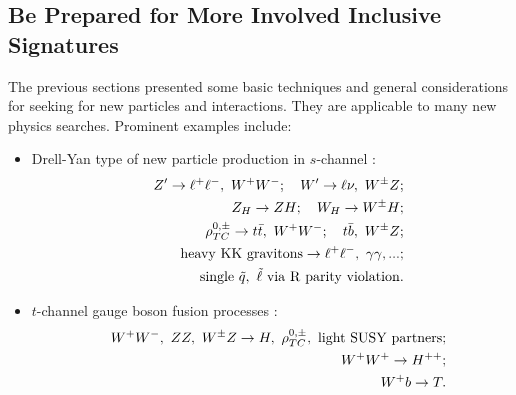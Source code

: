 \documentclass[12pt,prd,aps,floats,preprintnumbers,preprint,superscriptaddress,floatfix,nofootinbib]{revtex4}
\def\epem{e^+e^-}
\def\bea{\begin{eqnarray}}
\def\eea{\end{eqnarray}}
\begin{document}

\subsection{Be Prepared for More Involved Inclusive Signatures}
\label{more}

%
%
%
%

The previous sections presented some basic techniques and general
considerations for seeking for new particles and interactions. 
They are applicable to many new physics searches. 
 Prominent examples include:
\begin{itemize}
\item Drell-Yan type of new particle production in 
$s$-channel \cite{zprime,LH2,LH1,smoking,TC,RS,herbi2}:
\bea
\nonumber
&& Z' \to \ell^+\ell^-,\ W^+W^-;\quad W' \to \ell \nu,\ W^\pm Z; \\
\nonumber
&& Z_H \to ZH;\quad W_H \to W^\pm H;\\
\nonumber
&& \rho^{0,\pm}_{TC} \to t\bar t,\ W^+W^-;\quad t\bar b,\ W^\pm Z; \\
\nonumber
&& {\rm heavy\ KK\ gravitons}\to \ell^+\ell^-,\ \gamma\gamma, ... ;\\
&& {\rm single}\ \tilde q,\  \tilde\ell\ {\rm via\ R\ parity\ violation}.
\nonumber
\eea
\item $t$-channel gauge boson fusion processes \cite{WWSUSY,dicus,LH1,Mike,smoking}:
\bea
\nonumber
&& W^+W^-,\ ZZ,\ W^\pm Z \to H,\  \rho^{0,\pm}_{TC},\ {\rm light\ SUSY\   partners};\\ 
\nonumber
&& W^+W^+ \to H^{++};\\ 
&& W^+ b \to T.
\nonumber
\eea
\end{itemize}
\end{document}
